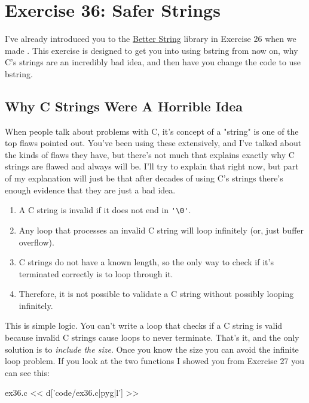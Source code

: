 \chapter{Exercise 36: Safer Strings}

I've already introduced you to the \href{http://bstring.sourceforge.net/}{Better String} library in Exercise 26 when we made .  This exercise
is designed to get you into using bstring from now on, why C's strings are
an incredibly bad idea, and then have you change the  
code to use bstring.

\section{Why C Strings Were A Horrible Idea}

When people talk about problems with C, it's concept of a "string" is one of the top flaws pointed out.
You've been using these extensively, and I've talked about the kinds of flaws they have, but there's
not much that explains exactly why C strings are flawed and always will be.  I'll try to explain
that right now, but part of my explanation will just be that after decades of using C's strings
there's enough evidence that they are just a bad idea.

\begin{enumerate}
\item A C string is invalid if it does not end in \verb|'\0'|.
\item Any loop that processes an invalid C string will loop infinitely (or, just buffer overflow).
\item C strings do not have a known length, so the only way to check if it's terminated correctly is to loop through it.
\item Therefore, it is not possible to validate a C string without possibly looping infinitely.
\end{enumerate}

This is simple logic.  You can't write a loop that checks if a C string is valid
because invalid C strings cause loops to never terminate.  That's it, and the
only solution is to \emph{include the size}.  Once you know the size you can
avoid the infinite loop problem.  If you look at the two functions I showed
you from Exercise 27 you can see this:

\begin{code}{ex36.c}
<< d['code/ex36.c|pyg|l'] >>
\end{code}

